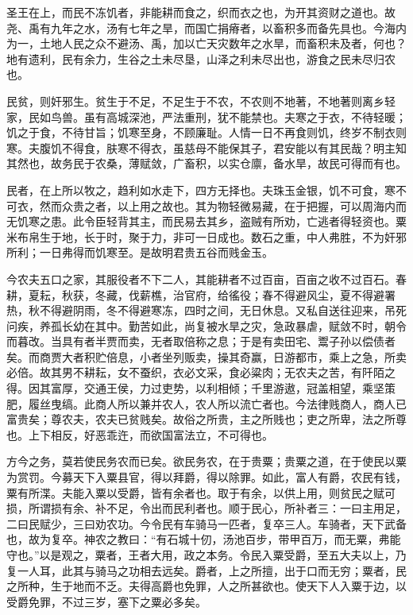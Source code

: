 \documentclass[UTF8,titlepage,oneside]{ctexbook}
\begin{document}
圣王在上，而民不冻饥者，非能耕而食之，织而衣之也，为开其资财之道也。故尧、禹有九年之水，汤有七年之旱，而国亡捐瘠者，以畜积多而备先具也。今海内为一，土地人民之众不避汤、禹，加以亡天灾数年之水旱，而畜积未及者，何也？地有遗利，民有余力，生谷之土未尽垦，山泽之利未尽出也，游食之民未尽归农也。

民贫，则奸邪生。贫生于不足，不足生于不农，不农则不地著，不地著则离乡轻家，民如鸟兽。虽有高城深池，严法重刑，犹不能禁也。夫寒之于衣，不待轻暖；饥之于食，不待甘旨；饥寒至身，不顾廉耻。人情一日不再食则饥，终岁不制衣则寒。夫腹饥不得食，肤寒不得衣，虽慈母不能保其子，君安能以有其民哉？明主知其然也，故务民于农桑，薄赋敛，广畜积，以实仓廪，备水旱，故民可得而有也。

民者，在上所以牧之，趋利如水走下，四方无择也。夫珠玉金银，饥不可食，寒不可衣，然而众贵之者，以上用之故也。其为物轻微易藏，在于把握，可以周海内而无饥寒之患。此令臣轻背其主，而民易去其乡，盗贼有所劝，亡逃者得轻资也。粟米布帛生于地，长于时，聚于力，非可一日成也。数石之重，中人弗胜，不为奸邪所利；一日弗得而饥寒至。是故明君贵五谷而贱金玉。

今农夫五口之家，其服役者不下二人，其能耕者不过百亩，百亩之收不过百石。春耕，夏耘，秋获，冬藏，伐薪樵，治官府，给徭役；春不得避风尘，夏不得避署热，秋不得避阴雨，冬不得避寒冻，四时之间，无日休息。又私自送往迎来，吊死问疾，养孤长幼在其中。勤苦如此，尚复被水旱之灾，急政暴虐，赋敛不时，朝令而暮改。当具有者半贾而卖，无者取倍称之息；于是有卖田宅、鬻子孙以偿债者矣。而商贾大者积贮倍息，小者坐列贩卖，操其奇赢，日游都市，乘上之急，所卖必倍。故其男不耕耘，女不蚕织，衣必文采，食必粱肉；无农夫之苦，有阡陌之得。因其富厚，交通王侯，力过吏势，以利相倾；千里游遨，冠盖相望，乘坚策肥，履丝曳缟。此商人所以兼并农人，农人所以流亡者也。今法律贱商人，商人已富贵矣；尊农夫，农夫已贫贱矣。故俗之所贵，主之所贱也；吏之所卑，法之所尊也。上下相反，好恶乖迕，而欲国富法立，不可得也。

方今之务，莫若使民务农而已矣。欲民务农，在于贵粟；贵粟之道，在于使民以粟为赏罚。今募天下入粟县官，得以拜爵，得以除罪。如此，富人有爵，农民有钱，粟有所渫。夫能入粟以受爵，皆有余者也。取于有余，以供上用，则贫民之赋可损，所谓损有余、补不足，令出而民利者也。顺于民心，所补者三：一曰主用足，二曰民赋少，三曰劝农功。今令民有车骑马一匹者，复卒三人。车骑者，天下武备也，故为复卒。神农之教曰：“有石城十仞，汤池百步，带甲百万，而无粟，弗能守也。”以是观之，粟者，王者大用，政之本务。令民入粟受爵，至五大夫以上，乃复一人耳，此其与骑马之功相去远矣。爵者，上之所擅，出于口而无穷；粟者，民之所种，生于地而不乏。夫得高爵也免罪，人之所甚欲也。使天下人入粟于边，以受爵免罪，不过三岁，塞下之粟必多矣。
\end{document}
